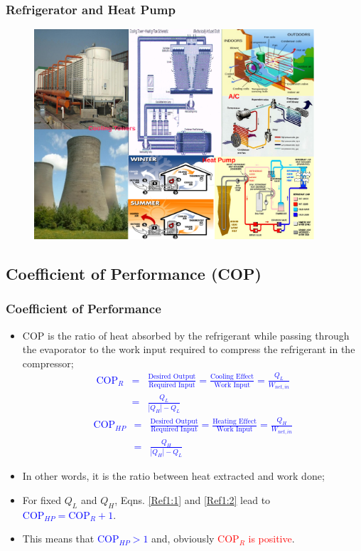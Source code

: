 \documentclass[10pt,compress]{beamer}
\newcommand{\frc}{\displaystyle\frac}
\begin{document}
\begin{frame}
 \frametitle{Refrigerator and Heat Pump}
    \begin{figure}%
     \begin{center}
      \includegraphics[width=12.cm,height=7.8cm]{./Pics/Overview_Refrig3}
     \end{center}
    \end{figure}
\end{frame}


\subsection{Coefficient of Performance (COP)}
\begin{frame}
 \frametitle{Coefficient of Performance}
 \begin{itemize}
  \item <1-> COP is the ratio of heat absorbed by the refrigerant while passing through the evaporator to the work input required to compress the refrigerant in the compressor;
   \textcolor{blue}{
   \begin{eqnarray}
    \text{COP}_{R} &=&\frc{\text{Desired Output}}{\text{Required Input}}=\frc{\text{Cooling Effect}}{\text{Work Input}}=\frc{Q_{L}}{W_{net,in}} \nonumber\\
                   &=& \frc{Q_{L}}{|Q_{H}|-Q_{L}}\label{Ref1:1}
   \end{eqnarray}
   \begin{eqnarray}
   \text{COP}_{HP}&=&\frc{\text{Desired Output}}{\text{Required Input}}=\frc{\text{Heating Effect}}{\text{Work Input}}=\frc{Q_{H}}{W_{net,in}} \nonumber \\
                 &=&\frc{Q_{H}}{|Q_{H}|-Q_{L}}    \label{Ref1:2}
   \end{eqnarray}}
  \item <2-> In other words, it is the ratio between heat extracted and work done;
  \item <3-> For fixed $Q_{L}$ and $Q_{H}$, Eqns. \ref{Ref1:1} and \ref{Ref1:2} lead to \textcolor{blue}{$\text{COP}_{HP}=\text{COP}_{R}+1$}.
  \item <4->This means that \textcolor{blue}{COP$_{HP}>1$} and, obviously \textcolor{red}{COP$_{R}$ is positive}.
 \end{itemize}
\end{frame}
\end{document}

